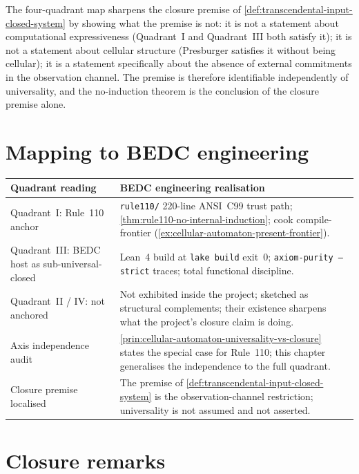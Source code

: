 \begin{principle}
\label{prin:quadrant-map-sharpens-closure}
The four-quadrant map sharpens the closure premise of \autoref{def:transcendental-input-closed-system} by showing what the premise is not: it is not a statement about computational expressiveness (Quadrant~I and Quadrant~III both satisfy it); it is not a statement about cellular structure (Presburger satisfies it without being cellular); it is a statement specifically about the absence of external commitments in the observation channel. The premise is therefore identifiable independently of universality, and the no-induction theorem is the conclusion of the closure premise alone.
\end{principle}

\section{Mapping to BEDC engineering}
\label{sec:quadrant-mapping-engineering}

\begin{longtable}{p{}p{}}
\toprule
\textbf{Quadrant reading} & \textbf{BEDC engineering realisation} \\
\midrule
Quadrant~I: Rule~110 anchor &
\texttt{rule110/} 220-line ANSI~C99 trust path; \autoref{thm:rule110-no-internal-induction}; cook compile-frontier (\autoref{ex:cellular-automaton-present-frontier}). \\
\midrule
Quadrant~III: BEDC host as sub-universal-closed &
Lean~4 build at \texttt{lake build} exit~0; \texttt{axiom-purity --strict} traces; total functional discipline. \\
\midrule
Quadrant~II / IV: not anchored &
Not exhibited inside the project; sketched as structural complements; their existence sharpens what the project's closure claim is doing. \\
\midrule
Axis independence audit &
\autoref{prin:cellular-automaton-universality-vs-closure} states the special case for Rule~110; this chapter generalises the independence to the full quadrant. \\
\midrule
Closure premise localised &
The premise of \autoref{def:transcendental-input-closed-system} is the observation-channel restriction; universality is not assumed and not asserted. \\
\bottomrule
\end{longtable}

\section{Closure remarks}
\label{sec:quadrant-closure}

